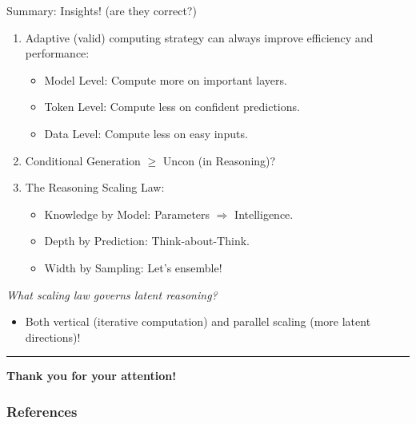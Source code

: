 \documentclass[12pt, aspectratio=169]{beamer}
\begin{document}
\begin{frame}{Summary: Insights! (are they correct?)}
\large 

\begin{enumerate}
    \setlength{\itemsep}{0.5cm}
    \item Adaptive (valid) computing strategy can always improve efficiency and performance: 
    \begin{itemize}
        \large
        \item Model Level: Compute more on important layers.
        \item Token Level: Compute less on confident predictions.
        \item Data Level: Compute less on easy inputs.
    \end{itemize}
    \item Conditional Generation $\geq$ Uncon (in Reasoning)?
    \item The Reasoning Scaling Law: 
    \begin{itemize}
        \large
        \item Knowledge by Model: Parameters $\Rightarrow$ Intelligence.
        \item Depth by Prediction: Think-about-Think.
        \item Width by Sampling: Let's ensemble! \citep{chen2025parallel}
    \end{itemize}
\end{enumerate}

\vspace{1cm}
\textit{What scaling law governs latent reasoning?}
\begin{itemize}
    \item Both vertical (iterative computation) and parallel scaling (more latent directions)!
\end{itemize}
    
\vspace{1cm}
\noindent\rule{\linewidth}{0.2mm}
\vspace{1cm}

\textbf{\Large Thank you for your attention!}
\end{frame}

\begin{frame}[allowframebreaks]
    \frametitle{References}
    \small %
    
    
\end{frame}

\end{document}
